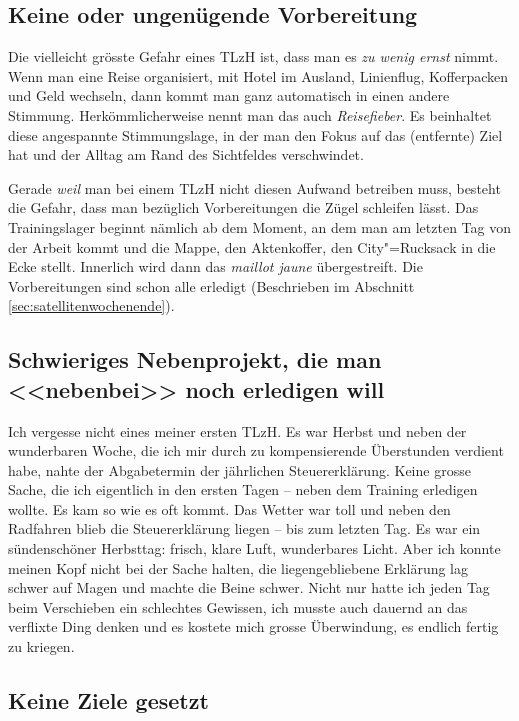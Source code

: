 \documentclass[a4paper,DIV13,BCOR0cm,draft=TRUE]{scrartcl}
\newcommand{\tlzh}{TLzH}
\begin{document}
\subsection{Keine oder ungenügende Vorbereitung}

Die vielleicht grösste Gefahr eines \tlzh{} ist, dass man es \emph{zu wenig ernst} nimmt.
Wenn man eine Reise organisiert, mit Hotel im Ausland, Linienflug, Kofferpacken und Geld wechseln, 
dann kommt man ganz automatisch in einen andere Stimmung.
Herkömmlicherweise nennt man das auch \emph{Reisefieber}.
Es beinhaltet diese angespannte Stimmungslage, in der man den Fokus auf das (entfernte) Ziel hat und der Alltag am Rand des Sichtfeldes verschwindet.

Gerade \emph{weil} man bei einem \tlzh{} nicht diesen Aufwand betreiben muss, besteht die Gefahr,
dass man bezüglich Vorbereitungen die Zügel schleifen lässt.
Das Trainingslager beginnt nämlich ab dem Moment, an dem man am letzten Tag von der Arbeit kommt und
die Mappe, den Aktenkoffer, den City"=Rucksack in die Ecke stellt.
Innerlich wird dann das \textsl{maillot jaune} übergestreift.
Die Vorbereitungen sind schon alle erledigt (Beschrieben im Abschnitt \ref{sec:satellitenwochenende}).

\subsection{Schwieriges Nebenprojekt, die man <<nebenbei>> noch erledigen will}

Ich vergesse nicht eines meiner ersten \tlzh{}. Es war Herbst und neben der wunderbaren Woche,
die ich mir durch zu kompensierende Überstunden verdient habe, nahte der Abgabetermin der jährlichen Steuererklärung.
Keine grosse Sache, die ich eigentlich in den ersten Tagen -- neben dem Training erledigen wollte.
Es kam so wie es oft kommt. Das Wetter war toll und neben den Radfahren blieb die Steuererklärung liegen -- bis zum letzten Tag.
Es war ein sündenschöner Herbsttag: frisch, klare Luft, wunderbares Licht.
Aber ich konnte meinen Kopf nicht bei der Sache halten, die liegengebliebene Erklärung lag schwer auf Magen und machte die Beine schwer.
Nicht nur hatte ich jeden Tag beim Verschieben ein schlechtes Gewissen,
ich musste auch dauernd an das verflixte Ding denken und es kostete mich grosse Überwindung, es endlich fertig zu kriegen.

\subsection{Keine Ziele gesetzt}
\end{document}
